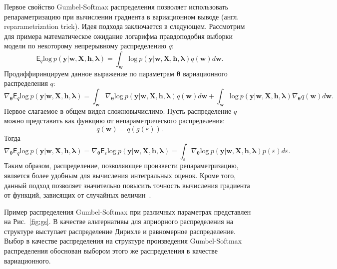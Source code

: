 Первое свойство Gumbel-Softmax распределения позволяет использовать репараметризацию при вычислении градиента в вариационном выводе (англ. reparametrization trick). 
Идея подхода заключается в следующем. Рассмотрим для примера математическое ожидание логарифма правдоподобия выборки модели по некоторому непрерывному распределению $q$:
\[
    \mathsf{E}_q \text{log}~p(\mathbf{y}|\mathbf{w}, \mathbf{X}, \mathbf{h}, \boldsymbol{\lambda})=  \int_{\mathbf{w}} \text{log}~p(\mathbf{y}|\mathbf{w}, \mathbf{X}, \mathbf{h}, \boldsymbol{\lambda})q(\mathbf{w})d\mathbf{w}.
\]
Продиффиринцируем данное выражение по параметрам $\boldsymbol{\theta}$ вариационного распределения $q$:
\[
    \nabla_{\boldsymbol{\theta}} \mathsf{E}_q \text{log}~p(\mathbf{y}|\mathbf{w}, \mathbf{X}, \mathbf{h}, \boldsymbol{\lambda}) = \int_{\mathbf{w}}  \nabla_{\boldsymbol{\theta}}\text{log}~p(\mathbf{y}|\mathbf{w}, \mathbf{X}, \mathbf{h}, \boldsymbol{\lambda})q(\mathbf{w})d\mathbf{w} + \int_{\mathbf{w}}  \text{log}~p(\mathbf{y}|\mathbf{w}, \mathbf{X}, \mathbf{h}, \boldsymbol{\lambda})\nabla_{\boldsymbol{\theta}}q(\mathbf{w})d\mathbf{w}.
\]
Первое слагаемое в общем видел сложновычислимо. Пусть распределение $q$ можно представить как функцию от непараметрического распределения:
\[
    q(\mathbf{w}) = q(g(\varepsilon)).
\]
Тогда 
\[
 \nabla_{\boldsymbol{\theta}} \mathsf{E}_q \text{log}~p(\mathbf{y}|\mathbf{w}, \mathbf{X}, \mathbf{h}, \boldsymbol{\lambda}) = \nabla_{\boldsymbol{\theta}} \mathsf{E}_{\varepsilon} \text{log}~p(\mathbf{y}|\mathbf{w}, \mathbf{X}, \mathbf{h}, \boldsymbol{\lambda}) = \int_{\varepsilon}  \nabla_{\boldsymbol{\theta}} \text{log}~p(\mathbf{y}|\mathbf{w}, \mathbf{X}, \mathbf{h}, \boldsymbol{\lambda})  p(\varepsilon) d\varepsilon.
\]
Таким образом, распределение, позволяющее произвести репараметризацию, является более удобным для вычисления интегральных оценок.
Кроме того, данный подход позволяет значительно повысить точность вычисления градиента от функций, зависящих от случайных величин~\cite{reparametrization}.

Пример распределения Gumbel-Softmax при различных параметрах представлен на Рис.~\ref{fig:gs}. В качестве альтернативы для априорного распределения на структуре выступает  распределение Дирихле и равномерное распределение. Выбор в качестве распределения на структуре произведения Gumbel-Softmax распределения обоснован выбором этого же распределения в качестве вариационного. 

